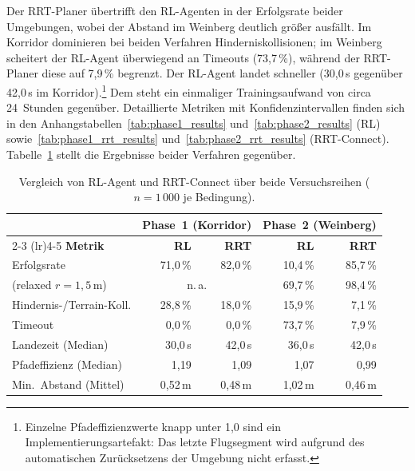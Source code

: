Der RRT-Planer übertrifft den RL-Agenten in der Erfolgsrate beider
Umgebungen, wobei der Abstand im Weinberg deutlich größer ausfällt. Im
Korridor dominieren bei beiden Verfahren Hinderniskollisionen; im Weinberg
scheitert der RL-Agent überwiegend an Timeouts (73,7\,\%), während der
RRT-Planer diese auf 7,9\,\% begrenzt. Der RL-Agent landet schneller
(30,0\,s gegenüber 42,0\,s im Korridor).\footnote{Einzelne
Pfadeffizienzwerte knapp unter 1,0 sind ein Implementierungsartefakt:
Das letzte Flugsegment wird aufgrund des automatischen Zurücksetzens der
Umgebung nicht erfasst.} Dem steht ein einmaliger Trainingsaufwand von
circa 24~Stunden gegenüber. Detaillierte Metriken mit
Konfidenzintervallen finden sich in den
Anhangstabellen~\ref{tab:phase1_results} und~\ref{tab:phase2_results}
(RL) sowie~\ref{tab:phase1_rrt_results}
und~\ref{tab:phase2_rrt_results} (RRT-Connect). Tabelle~\ref{tab:vergleich_rl_rrt} stellt die Ergebnisse beider Verfahren
gegenüber.

\begin{table}[H]
  \centering
  \caption[Vergleich RL-Agent und RRT-Connect]{Vergleich von RL-Agent und
  RRT-Connect über beide Versuchsreihen ($n = 1\,000$ je Bedingung).}
  \label{tab:vergleich_rl_rrt}
  \footnotesize
  \renewcommand{\arraystretch}{1.15}
  \begin{tabular}{l r r r r}
    \toprule
    & \multicolumn{2}{c}{\textbf{Phase~1 (Korridor)}}
    & \multicolumn{2}{c}{\textbf{Phase~2 (Weinberg)}} \\
    \cmidrule(lr){2-3} \cmidrule(lr){4-5}
    \textbf{Metrik}
      & \textbf{RL} & \textbf{RRT}
      & \textbf{RL} & \textbf{RRT} \\
    \midrule
    Erfolgsrate
      & 71,0\,\%       & 82,0\,\%
      & 10,4\,\%       & 85,7\,\% \\
    \quad(relaxed $r = 1{,}5$\,m)
      & \multicolumn{2}{c}{n.\,a.}
      & 69,7\,\%       & 98,4\,\% \\
    \addlinespace
    Hindernis-/Terrain-Koll.
      & 28,8\,\%       & 18,0\,\%
      & 15,9\,\%       & 7,1\,\% \\
    Timeout
      & 0,0\,\%        & 0,0\,\%
      & 73,7\,\%       & 7,9\,\% \\
    \addlinespace
    Landezeit (Median)
      & 30,0\,s         & 42,0\,s
      & 36,0\,s         & 42,0\,s \\
    Pfadeffizienz (Median)
      & 1,19            & 1,09
      & 1,07            & 0,99 \\
    Min.\ Abstand (Mittel)
      & 0,52\,m         & 0,48\,m
      & 1,02\,m         & 0,46\,m \\
    \bottomrule
  \end{tabular}
\end{table}